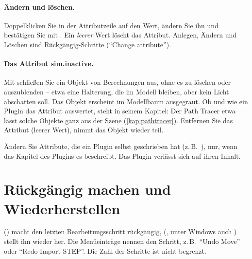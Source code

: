 \paragraph{Ändern und löschen.} Doppelklicken Sie in der Attributzeile auf den Wert, ändern Sie
ihn und bestätigen Sie mit . Ein \emph{leerer} Wert löscht das Attribut. Anlegen,
Ändern und Löschen sind Rückgängig-Schritte (\enquote{Change attribute}).

\paragraph{Das Attribut sim.inactive.} Mit 
schließen Sie ein Objekt von Berechnungen aus, ohne es zu löschen oder auszublenden -- etwa
eine Halterung, die im Modell bleiben, aber kein Licht abschatten soll. Das Objekt erscheint im
Modellbaum ausgegraut. Ob und wie ein Plugin das Attribut auswertet, steht in seinem Kapitel:
Der Path Tracer etwa lässt solche Objekte ganz aus der Szene (\autoref{kap:pathtracer}).
Entfernen Sie das Attribut (leerer Wert), nimmt das Objekt wieder teil.

\begin{warnung}
Ändern Sie Attribute, die ein Plugin selbst geschrieben hat (z.\,B.\ ),
nur, wenn das Kapitel des Plugins es beschreibt. Das Plugin verlässt sich auf ihren Inhalt.
\end{warnung}

\section{Rückgängig machen und Wiederherstellen}\label{sec:undo}

 () macht den letzten Bearbeitungsschritt rückgängig,
 (, unter Windows auch ) stellt ihn wieder
her. Die Menüeinträge nennen den Schritt, z.\,B.\ \enquote{Undo Move} oder \enquote{Redo
Import STEP}. Die Zahl der Schritte ist nicht begrenzt.

